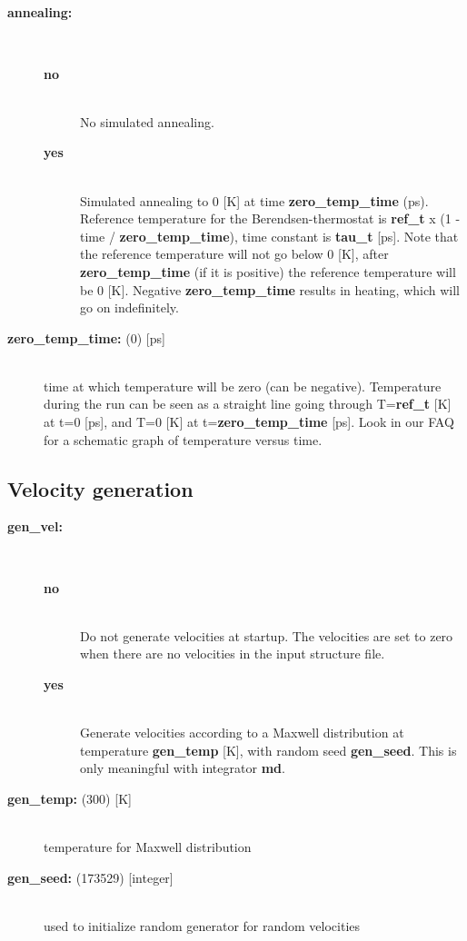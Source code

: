 \subsection{}
\begin{description}
\item[{\bf annealing:}]\mbox{}\\
\vspace{-2ex}\begin{description}
\item[{\bf no}]\mbox{}\\
No simulated annealing. 
\item[{\bf yes}]\mbox{}\\
Simulated annealing to 0 [K] at time {\bf zero\_temp\_time} (ps).
Reference temperature for the Berendsen-thermostat is
{\bf ref\_t} x (1 - time / {\bf zero\_temp\_time}),
time constant is {\bf tau\_t} [ps]. Note that the reference temperature
will not go below 0 [K], {\ie} after {\bf zero\_temp\_time} (if it is positive) 
the reference temperature will be 0 [K]. Negative {\bf zero\_temp\_time} 
results in heating, which will go on indefinitely.
\end{description}
\item[{\bf zero\_temp\_time: }(0) {[ps]}]\mbox{}\\
time at which temperature will be zero (can be negative). Temperature
during the run can be seen as a straight line going through 
T={\bf ref\_t} [K] at t=0 [ps], and 
T=0 [K] at t={\bf zero\_temp\_time} [ps]. Look in our 
FAQ for a schematic 
graph of temperature versus time.
\end{description}

\subsection{Velocity generation}
\begin{description}
\item[{\bf gen\_vel:}]\mbox{}\\
\vspace{-2ex}\begin{description}
\item[{\bf no}]\mbox{}\\
 Do not generate velocities at startup. The velocities are set to zero
when there are no velocities in the input structure file.
\item[{\bf yes}]\mbox{}\\
Generate velocities according to a Maxwell distribution at
temperature {\bf gen\_temp} [K], with random seed {\bf gen\_seed}. 
This is only meaningful with integrator {\bf md}.
\end{description}
\item[{\bf gen\_temp: }(300) {[K]}]\mbox{}\\
temperature for Maxwell distribution
\item[{\bf gen\_seed: }(173529) {[integer]}]\mbox{}\\
used to initialize random generator for random velocities
\end{description}

